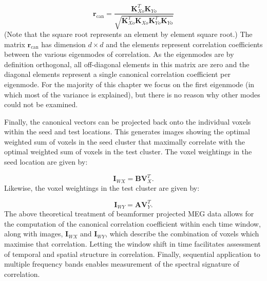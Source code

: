 \begin{equation}
\mathbf{r}_\text{can} = \frac{\mathbf{K}_{Xo}^T\mathbf{K}_{Yo}}{\sqrt{\mathbf{K}_{Xo}^T\mathbf{K}_{Xo}\mathbf{K}_{Yo}^T\mathbf{K}_{Yo}}}
\end{equation} (Note that the square root represents an element by element square root.) The matrix $\mathbf{r}_\text{can}$ has dimension $d\times d$ and the elements represent correlation coefficients between the various eigenmodes of correlation. As the eigenmodes are by definition orthogonal, all off-diagonal elements in this matrix are zero and the diagonal elements represent a single canonical correlation coefficient per eigenmode. For the majority of this chapter we focus on the first eigenmode (in which most of the variance is explained), but there is no reason why other modes could not be examined. 

Finally, the canonical vectors can be projected back onto the individual voxels within the seed and test locations. This generates images showing the optimal weighted sum of voxels in the seed cluster that maximally correlate with the optimal weighted sum of voxels in the test cluster. The voxel weightings in the seed location are given by:

\begin{equation}
\mathbf{I}_{WX} = \mathbf{BV}_X^T.
\end{equation} Likewise, the voxel weightings in the test cluster are given by:

\begin{equation}
\mathbf{I}_{WY} = \mathbf{AV}_Y^T.
\end{equation} The above theoretical treatment of beamformer projected MEG data allows for the computation of the canonical correlation coefficient within each time window, along with images, $\mathbf{I}_{WX}$ and $\mathbf{I}_{WY}$, which describe the combination of voxels which maximise that correlation. Letting the window shift in time facilitates assessment of temporal and spatial structure in correlation. Finally, sequential application to multiple frequency bands enables measurement of the spectral signature of correlation. 
 
